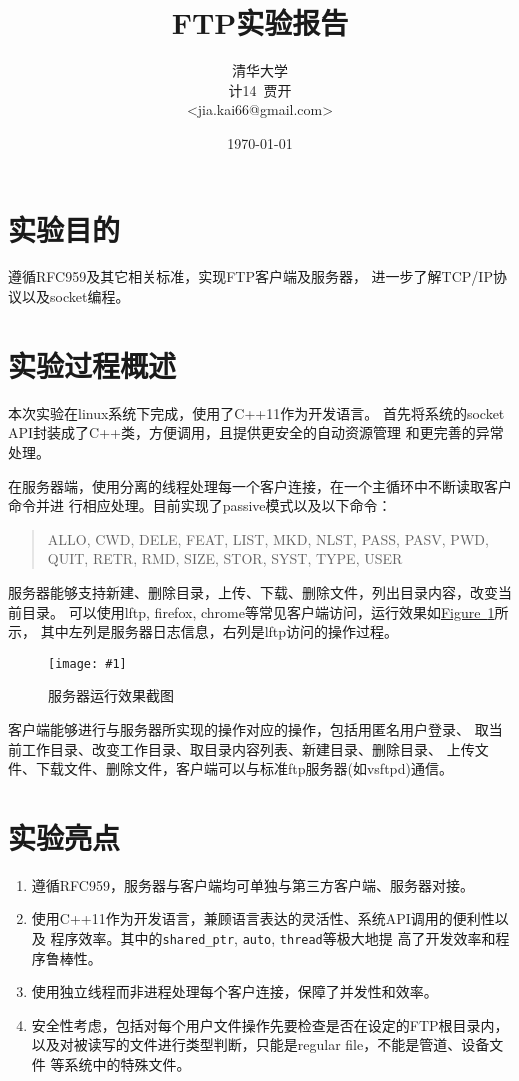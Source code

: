 \documentclass[a4paper]{article}
\title{FTP实验报告}
\author{清华大学\\计14~贾开\\<jia.kai66@gmail.com>}
\date{\today}
\newcommand{\addplot}[1]{\begin{center}
	\texttt{[image: \#1]}
\end{center}}
\newcommand{\figref}[1]{\hyperref[fig:#1]{Figure~\ref*{fig:#1}}}
\begin{document}
\maketitle
\tableofcontents

\section{实验目的}
遵循RFC959及其它相关标准，实现FTP客户端及服务器，
进一步了解TCP/IP协议以及socket编程。

\section{实验过程概述}
本次实验在linux系统下完成，使用了C++11作为开发语言。
首先将系统的socket API封装成了C++类，方便调用，且提供更安全的自动资源管理
和更完善的异常处理。

在服务器端，使用分离的线程处理每一个客户连接，在一个主循环中不断读取客户命令并进
行相应处理。目前实现了passive模式以及以下命令： 
\begin{quote}
	ALLO, CWD, DELE, FEAT, LIST, MKD, NLST, PASS, PASV, PWD, QUIT, RETR, RMD,
	SIZE, STOR, SYST, TYPE, USER
\end{quote}

服务器能够支持新建、删除目录，上传、下载、删除文件，列出目录内容，改变当前目录。
可以使用lftp, firefox, chrome等常见客户端访问，运行效果如\figref{server}所示，
其中左列是服务器日志信息，右列是lftp访问的操作过程。
\begin{figure}[h!]
	\addplot{../img/server.png}
	\caption{\label{fig:server}服务器运行效果截图}
\end{figure}

客户端能够进行与服务器所实现的操作对应的操作，包括用匿名用户登录、
取当前工作目录、改变工作目录、取目录内容列表、新建目录、删除目录、
上传文件、下载文件、删除文件，客户端可以与标准ftp服务器(如vsftpd)通信。


\section{实验亮点}
\begin{enumerate}
	\item 遵循RFC959，服务器与客户端均可单独与第三方客户端、服务器对接。
	\item 使用C++11作为开发语言，兼顾语言表达的灵活性、系统API调用的便利性以及
		程序效率。其中的\verb|shared_ptr|, \verb|auto|, \verb|thread|等极大地提
		高了开发效率和程序鲁棒性。
	\item 使用独立线程而非进程处理每个客户连接，保障了并发性和效率。
	\item 安全性考虑，包括对每个用户文件操作先要检查是否在设定的FTP根目录内，
		以及对被读写的文件进行类型判断，只能是regular file，不能是管道、设备文件
		等系统中的特殊文件。
\end{enumerate}
\end{document}
